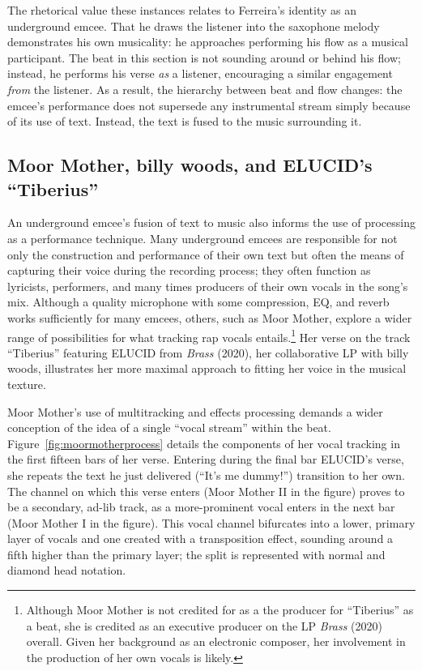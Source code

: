 The rhetorical value these instances relates to Ferreira's identity as an underground emcee. That he draws the
listener into the saxophone melody demonstrates his own musicality: he approaches performing his flow as a musical
participant. The beat in this section is not sounding around or behind his flow; instead, he performs his verse
\emph{as} a listener, encouraging a similar engagement \emph{from} the listener. As a result, the hierarchy between
beat and flow changes: the emcee's performance does not supersede any instrumental stream simply because of its use
of text. Instead, the text is fused to the music surrounding it.

{}
\subsection*{\centering Moor Mother,  billy woods, and ELUCID's ``Tiberius''}

An underground emcee's fusion of text to music also informs the use of processing as a performance technique. Many 
underground emcees are responsible for not only the construction and performance of their own text but often the 
means of capturing their voice during the recording process; they often function as lyricists, performers, and many
times producers of their own vocals in the song's mix. Although a quality microphone with some compression, EQ, and 
reverb works sufficiently for many emcees, others, such as Moor Mother, explore a wider range of possibilities
for what tracking rap vocals entails.\footnote{
    Although Moor Mother is not credited for as a the producer for ``Tiberius'' as a beat, she is credited as an executive
    producer on the LP \textit{Brass} (2020) overall. Given her background as an electronic composer, her involvement in
    the production of her own vocals is likely.} 
Her verse on the track ``Tiberius'' featuring ELUCID from \textit{Brass} (2020), her collaborative LP with billy woods, 
illustrates her more maximal approach to fitting her voice in the musical texture.

Moor Mother's use of multitracking and effects processing demands a wider conception of the idea of a single ``vocal 
stream'' within the beat. Figure~\ref{fig:moormotherprocess} details the components of her vocal tracking in the 
first fifteen bars of her verse. Entering during the final bar ELUCID's verse, she repeats the text he just delivered
(``It's me dummy!'') transition to her own. The channel on which this verse enters (Moor Mother II in the figure) 
proves to be a secondary, ad-lib track, as a more-prominent vocal enters in the next bar (Moor Mother I in the figure).
This vocal channel bifurcates into a lower, primary layer of vocals and one created with a transposition effect, 
sounding around a fifth higher than the primary layer; the split is represented with normal and diamond head notation.

